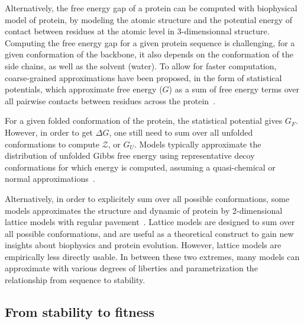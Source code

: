 Alternatively, the free energy gap of a protein can be computed with biophysical model of protein, by modeling the atomic structure and the potential energy of contact between residues at the atomic level in 3-dimensionnal structure.
Computing the free energy gap for a given protein sequence is challenging, for a given conformation of the backbone, it also depends on the conformation of the side chains, as well as the solvent (water).
To allow for faster computation, coarse-grained approximations have been proposed, in the form of statistical potentials, which approximate free energy ($G$) as a sum of free energy terms over all pairwise contacts between residues across the protein~\citep{Miyazawa1985}.

For a given folded conformation of the protein, the statistical potential gives $G_F$.
However, in order to get $\Delta G$, one still need to sum over all unfolded conformations to compute $\mathcal{Z}$, or $G_U$.
Models typically approximate the distribution of unfolded Gibbs free energy using representative decoy conformations for which energy is computed, assuming a quasi-chemical or normal approximations~\citep{Goldstein2011}.

Alternatively, in order to explicitely sum over all possible conformations, some models approximates the structure and dynamic of protein by 2-dimensional lattice models with regular pavement~\citep{Taverna2002, Noivirt-Brik2009}.
Lattice models are designed to sum over all possible conformations, and are useful as a theoretical construct to gain new insights about biophysics and protein evolution.
However, lattice models are empirically less directly usable.
In between these two extremes, many models can approximate with various degrees of liberties and parametrization the relationship from sequence to stability.


\subsection{From stability to fitness}

